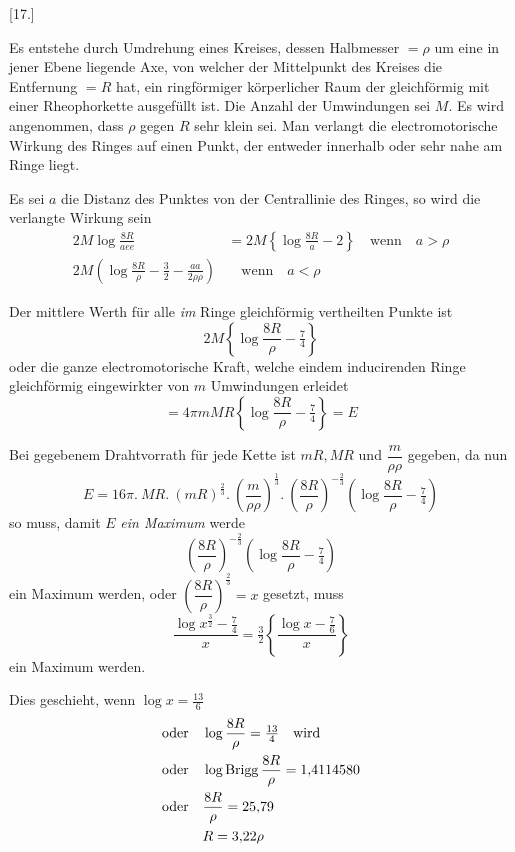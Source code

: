 \begin{center}[17.]\end{center}
Es entstehe durch Umdrehung eines Kreises, dessen Halbmesser $=\rho$ um eine in jener Ebene liegende Axe, von welcher der Mittelpunkt des Kreises die Entfernung $=R$ hat, ein ringförmiger körperlicher Raum der gleichförmig mit einer Rheophorkette ausgefüllt ist. Die Anzahl der Umwindungen sei $M$. Es wird angenommen, dass $\rho$ gegen $R$ sehr klein sei. Man verlangt die electromotorische Wirkung des Ringes auf einen Punkt, der entweder innerhalb oder sehr nahe am Ringe liegt.
\begin{center}\resizebox{.44\textwidth}{!}{}\end{center}

Es sei $a$ die Distanz des Punktes von der Centrallinie des Ringes, so wird die verlangte Wirkung sein
\[
\begin{aligned}
2M\log\frac{8R}{aee}&=2M\left\{\log\frac{8R}{a}-2\right\}\quad\text{wenn}\quad a>\rho\\
2M\left(\log\frac{8R}{\rho}-\tfrac32-\frac{aa}{2\rho\rho}\right)&\quad\text{wenn}\quad a<\rho
\end{aligned}
\]

Der mittlere Werth für alle \textit{im} Ringe gleichförmig vertheilten Punkte ist
\[
2M\left\{\log\frac{8R}{\rho}-\tfrac74\right\}
\]
oder die ganze electromotorische Kraft, welche eindem inducirenden Ringe gleichförmig eingewirkter von $m$ Umwindungen erleidet
\[
=4\pi mMR\left\{\log\frac{8R}{\rho}-\tfrac74\right\}=E
\]

Bei gegebenem Drahtvorrath für jede Kette ist $mR,MR$ und $\dfrac{m}{\rho\rho}$ gegeben, da nun
\[
E=16\pi.\ MR.\ (mR)^{\frac23}.\ \left(\frac{m}{\rho\rho}\right)^{\frac13}.\ \left(\frac{8R}{\rho}\right)^{-\frac23}\left(\log\frac{8R}{\rho}-\tfrac74\right)
\]
so muss, damit $E$ \textit{ein Maximum} werde
\[
\left(\frac{8R}{\rho}\right)^{-\frac23}\left(\log\frac{8R}{\rho}-\tfrac74\right)
\]
ein Maximum werden, oder $\left(\dfrac{8R}{\rho}\right)^{\frac23}=x$ gesetzt, muss
\[
\frac{\log x^{\frac32}-\tfrac74}{x}=\tfrac32\left\{\frac{\log x-\tfrac76}{x}\right\}
\]
ein Maximum werden.

Dies geschieht, wenn $\log x=\tfrac{13}{6}$
\[
\begin{aligned}
&\text{oder}\quad\log\frac{8R}{\rho}=\tfrac{13}{4}\quad\text{wird}\\
&\text{oder}\quad\log\operatorname{Brigg}\frac{8R}{\rho}=1{,}4114580\\
&\text{oder}\quad\frac{8R}{\rho}=25{,}79\\
&\hphantom{\text{oder}\quad}R=3{,}22\rho
\end{aligned}
\]

